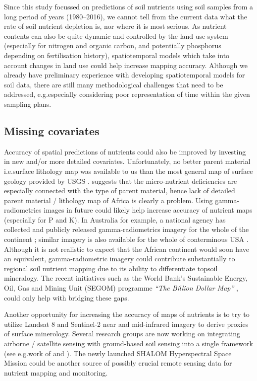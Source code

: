 \begin{linenumbers}
Since this study focussed on predictions of soil nutrients using soil samples from a long period of years (1980--2016), we cannot tell from the current data what the rate of soil nutrient depletion is, nor where it is most serious. As nutrient contents can also be quite dynamic and controlled by the land use system (especially for nitrogen and organic carbon, and potentially phosphorus depending on fertilisation history), spatiotemporal models which take into account changes in land use could help increase mapping accuracy. Although we already have preliminary experience with developing spatiotemporal models for soil data, there are still many methodological challenges that need to be addressed, e.g.\@ especially considering poor representation of time within the given sampling plans.\par

\subsection{Missing covariates}

Accuracy of spatial predictions of nutrients could also be improved by investing in new and/or more detailed covariates. Unfortunately, no better parent material i.e.\@ surface lithology map was available to us than the most general map of surface geology provided by USGS \citep{Persits1997}. \citet{Kang1985} suggests that the micro-nutrient deficiencies are especially connected with the type of parent material, hence lack of detailed parent material / lithology map of Africa is clearly a problem. Using gamma-radiometrics images in future could likely help increase accuracy of nutrient maps (especially for P and K). In Australia for example, a national agency has collected and publicly released gamma-radiometrics imagery for the whole of the continent \citep{minty2009radiometric}; similar imagery is also available for the whole of conterminous USA \citep{duval2005terrestrial}. Although it is not realistic to expect that the African continent would soon have an equivalent, gamma-radiometric imagery could contribute substantially to regional soil nutrient mapping due to its ability to differentiate topsoil mineralogy. The recent initiatives such as the World Bank's Sustainable Energy, Oil, Gas and Mining Unit (SEGOM) programme \emph{``The Billion Dollar Map''} \citep{Ovadia2015}, could only help with bridging these gaps.\par

Another opportunity for increasing the accuracy of maps of nutrients is to try to utilize Landsat 8 and Sentinel-2 near and mid-infrared imagery to derive proxies of surface minerology. Several research groups are now working on integrating airborne / satellite sensing with ground-based soil sensing into a single framework (see e.g.\@ work of \citet{stevens2008laboratory} and \citet{ben2009using}). The newly launched SHALOM Hyperspectral Space Mission \citep{feingersh2015shalom} could be another source of possibly crucial remote sensing data for nutrient mapping and monitoring.\par


\end{linenumbers}

